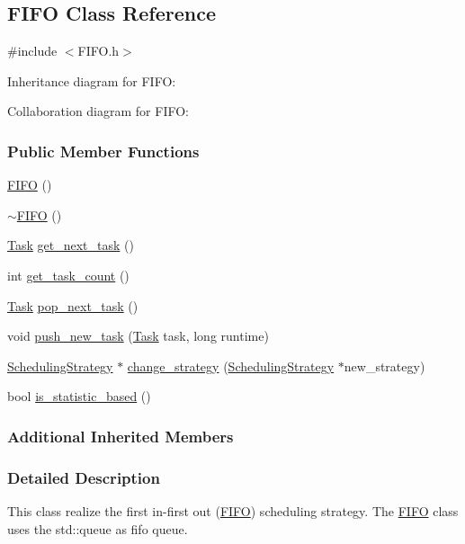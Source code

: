 \hypertarget{a00016}{}\subsection{F\+I\+F\+O Class Reference}
\label{a00016}


{\ttfamily \#include $<$F\+I\+F\+O.\+h$>$}



Inheritance diagram for F\+I\+F\+O\+:


Collaboration diagram for F\+I\+F\+O\+:
\subsubsection*{Public Member Functions}
\begin{DoxyCompactItemize}
\item 
\hyperlink{a00016_aea969385961885a8e70732482d64fead}{F\+I\+F\+O} ()
\item 
\hyperlink{a00016_a44d31a29b91fed5e154f26bf9df4d280}{$\sim$\+F\+I\+F\+O} ()
\item 
\hyperlink{a00002}{Task} \hyperlink{a00016_a4f1234aa7afcd3017a7e0470a63a28c7}{get\+\_\+next\+\_\+task} ()
\item 
int \hyperlink{a00016_a4a03d69c49827b555a4968733195fd01}{get\+\_\+task\+\_\+count} ()
\item 
\hyperlink{a00002}{Task} \hyperlink{a00016_aa96d491319ffa72dbb923693a692ed40}{pop\+\_\+next\+\_\+task} ()
\item 
void \hyperlink{a00016_aa91a84fbe7f8755b4fd7dab27dfd3b72}{push\+\_\+new\+\_\+task} (\hyperlink{a00002}{Task} task, long runtime)
\item 
\hyperlink{a00033}{Scheduling\+Strategy} $\ast$ \hyperlink{a00016_a1f94031b462c35718f2d3ebe16acfa9c}{change\+\_\+strategy} (\hyperlink{a00033}{Scheduling\+Strategy} $\ast$new\+\_\+strategy)
\item 
bool \hyperlink{a00016_aff0f1a994e551ccfad05e7338652a16d}{is\+\_\+statistic\+\_\+based} ()
\end{DoxyCompactItemize}
\subsubsection*{Additional Inherited Members}


\subsubsection{Detailed Description}
This class realize the first in-\/first out (\hyperlink{a00016}{F\+I\+F\+O}) scheduling strategy. The \hyperlink{a00016}{F\+I\+F\+O} class uses the std\+::queue as fifo queue.


